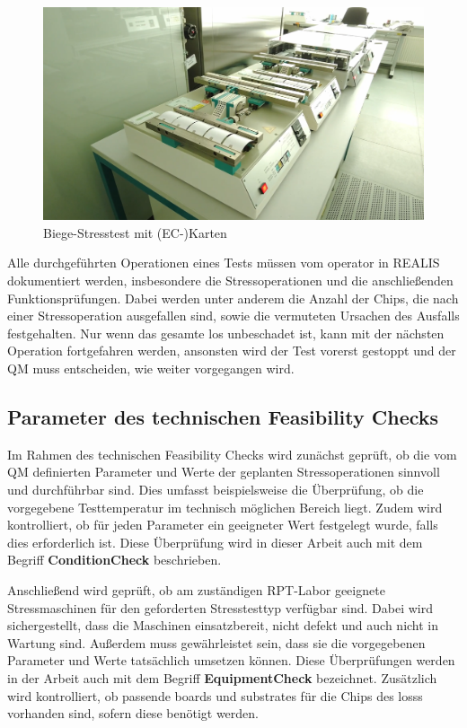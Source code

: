 \begin{figure}[!htbp]
    \centering
    \includegraphics[width=1\textwidth]{bilder/stresstest-card1.png}
    \caption{Biege-Stresstest mit (EC-)Karten \cite{RPTLaborIntern}}
    \label{fig:stresstest-card}
\end{figure}

Alle durchgeführten Operationen eines Tests müssen vom \gls{operator} in \gls{REALIS} dokumentiert werden, insbesondere die Stressoperationen und die anschließenden Funktionsprüfungen. Dabei werden unter anderem die Anzahl der Chips, die nach einer Stressoperation ausgefallen sind, sowie die vermuteten Ursachen des Ausfalls festgehalten.
Nur wenn das gesamte \gls{los} unbeschadet ist, kann mit der nächsten Operation fortgefahren werden, ansonsten wird der Test vorerst gestoppt und der \gls{QM} muss entscheiden, wie weiter vorgegangen wird.

\subsection{Parameter des technischen Feasibility Checks}\label{Subsec:ParameterdestechnischenFeasibilityChecks}

Im Rahmen des technischen Feasibility Checks wird zunächst geprüft, ob die vom \gls{QM} definierten Parameter und Werte der geplanten Stressoperationen sinnvoll und durchführbar sind. Dies umfasst beispielsweise die Überprüfung, ob die vorgegebene Testtemperatur im technisch möglichen Bereich liegt. Zudem wird kontrolliert, ob für jeden Parameter ein geeigneter Wert festgelegt wurde, falls dies erforderlich ist. Diese Überprüfung wird in dieser Arbeit auch mit dem Begriff \textbf{\gls{ConditionCheck}} beschrieben.

Anschließend wird geprüft, ob am zuständigen \gls{RPT}-Labor geeignete Stressmaschinen für den geforderten Stresstesttyp verfügbar sind. Dabei wird sichergestellt, dass die Maschinen einsatzbereit, nicht defekt und auch nicht in Wartung sind. Außerdem muss gewährleistet sein, dass sie die vorgegebenen Parameter und Werte tatsächlich umsetzen können. Diese Überprüfungen werden in der Arbeit auch mit dem Begriff \textbf{\gls{EquipmentCheck}} bezeichnet.
Zusätzlich wird kontrolliert, ob passende \glspl{board} und \glspl{substrate} für die Chips des \glspl{los}s vorhanden sind, sofern diese benötigt werden.

